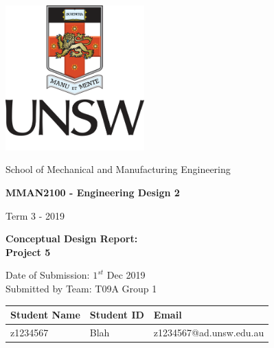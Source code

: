\documentclass[12pt]{report}
\begin{document}
    \begin{titlepage}
        \begin{center}
            \includegraphics[width=0.4\textwidth]{unswLogo}
            
            \begin{huge}
            \end{huge}
            
            \vspace*{0.6cm}
            
            School of Mechanical and Manufacturing Engineering
            \vspace{0.6cm}
            
            \textbf{MMAN2100 - Engineering Design 2}
            \vspace{0.3cm}
            
            Term 3 - 2019
            \vspace{0.3cm}
     
            \textbf{Conceptual Design Report:\\Project 5}
            \vspace{0.3cm}
            
            
            Date of Submission: $1^{st}$ Dec 2019\\
            Submitted by Team: T09A Group 1

            \begin{table}[h]
                \centering
                \begin{tabular}[h]{|l|l|l|}\hline
                    Student Name & Student ID & Email \\\hline
                    z1234567 & Blah & z1234567@ad.unsw.edu.au \\\hline
                \end{tabular}
            \end{table}

       \end{center}
    \end{titlepage}
\end{document}
